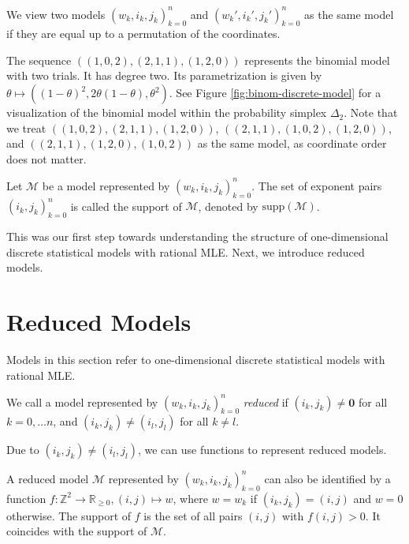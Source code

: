 \begin{remark}\label{rem:equivalent-models}
    We view two models \( (w_k,i_k,j_k)_{k=0}^n \) and \( (w_k',i_k',j_k')_{k=0}^n \) as the same model if they are equal up to a permutation of the coordinates.
\end{remark}

\begin{example}
    The sequence \( ((1,0,2), (2,1,1), (1,2,0)) \) represents the binomial model with two trials. It has degree two. Its parametrization is given by \( \theta \mapsto ((1-\theta)^2, 2\theta(1-\theta),\theta^2) \). See Figure \ref{fig:binom-discrete-model} for a visualization of the binomial model within the probability simplex \( \Delta_2 \). Note that we treat \( ((1,0,2), (2,1,1), (1,2,0)) \), \( ((2,1,1), (1,0,2), (1,2,0)) \), and \( ((2,1,1), (1,2,0), (1,0,2)) \) as the same model, as coordinate order does not matter.
\end{example}

\begin{definition}
    Let \( \mathcal{M} \) be a model represented by \( (w_k, i_k, j_k)_{k=0}^n \). The set of exponent pairs \( (i_k, j_k)_{k=0}^n \) is called the support of \( \mathcal{M} \), denoted by \( \mathrm{supp}(\mathcal{M}) \).
\end{definition}

This was our first step towards understanding the structure of one-dimensional discrete statistical models with rational MLE. Next, we introduce reduced models.

\section{Reduced Models}

Models in this section refer to one-dimensional discrete statistical models with rational MLE.

\begin{definition}
    We call a model represented by \( (w_k, i_k, j_k)_{k=0}^n \) \emph{reduced} if \( (i_k, j_k) \neq \mathbf 0 \) for all \( k = 0, \dots n \), and \( (i_k, j_k) \neq (i_l, j_l) \) for all \( k \neq l \).
\end{definition}

Due to \( (i_k, j_k) \neq (i_l, j_l) \), we can use functions to represent reduced models.

\begin{remark}\label{rem:representation-of-models-by-functions}
    A reduced model \( \mathcal{M} \) represented by \( (w_k, i_k, j_k)_{k=0}^n \) can also be identified by a function \( f: \mathbb{Z}^2 \to \mathbb{R}_{\geq 0}, (i, j) \mapsto w \), where \( w = w_k \) if \( (i_k, j_k) = (i, j) \) and \( w = 0 \) otherwise. The support of \( f \) is the set of all pairs \( (i, j) \) with \( f(i, j) > 0 \). It coincides with the support of \( \mathcal{M} \).
\end{remark}


